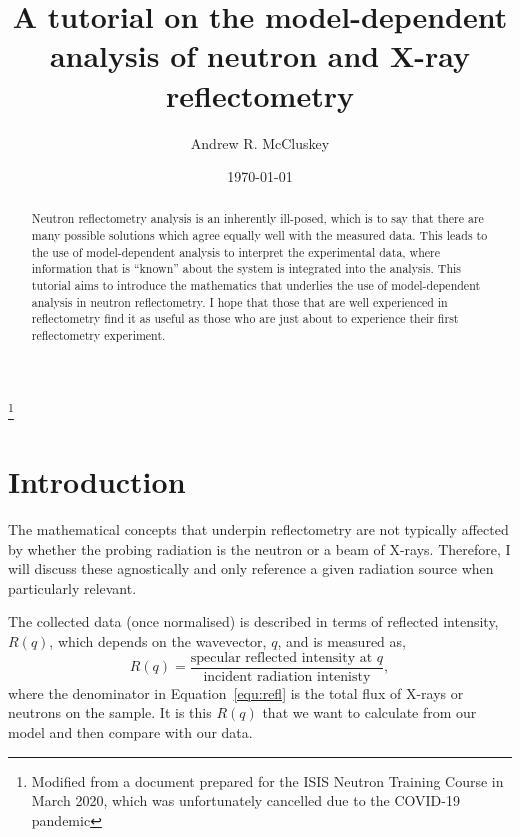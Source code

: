 \documentclass[
 reprint,
 superscriptaddress,
 amsmath,amssymb,
 aps,
]{revtex4-2}
\begin{document}
\title{A tutorial on the model-dependent analysis of neutron and X-ray reflectometry}%
\thanks{Modified from a document prepared for the ISIS Neutron Training Course in March 2020, which was unfortunately cancelled due to the COVID-19 pandemic}%

\author{Andrew R. McCluskey}



\date{\today}%

\begin{abstract}
Neutron reflectometry analysis is an inherently ill-posed, which is to say that there are many possible solutions which agree equally well with the measured data. 
This leads to the use of model-dependent analysis to interpret the experimental data, where information that is ``known'' about the system is integrated into the analysis.
This tutorial aims to introduce the mathematics that underlies the use of model-dependent analysis in neutron reflectometry. 
I hope that those that are well experienced in reflectometry find it as useful as those who are just about to experience their first reflectometry experiment. 
\end{abstract}

\maketitle

\section{Introduction}
The mathematical concepts that underpin reflectometry are not typically affected by whether the probing radiation is the neutron or a beam of X-rays. 
Therefore, I will discuss these agnostically and only reference a given radiation source when particularly relevant.

The collected data (once normalised) is described in terms of reflected intensity, $R(q)$, which depends on the wavevector, $q$, and is measured as,
%
\begin{equation}
    R(q) = \frac{\text{specular reflected intensity at $q$}}{\text{incident radiation intenisty}}, 
    \label{equ:refl}
\end{equation}
%
where the denominator in Equation~\ref{equ:refl} is the total flux of X-rays or neutrons on the sample.
It is this $R(q)$ that we want to calculate from our model and then compare with our data. 
\end{document}
